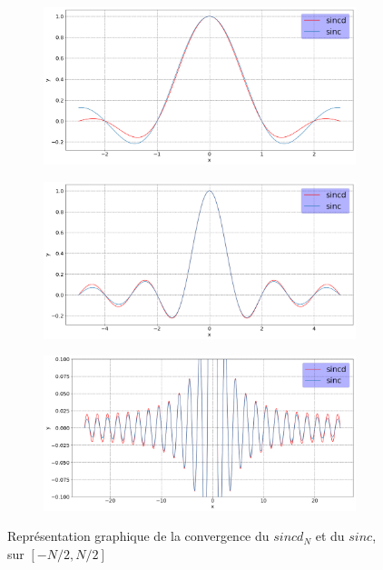 \documentclass[12pt,a4paper,onecolumn]{article}
\begin{document}
\begin{figure}[H]
	\centering
	\begin{subfigure}[b]{\textwidth}
		\centering
		\includegraphics[height = 0.25\textheight]{6_5}
		\label{fig_6_5}
	\end{subfigure}
	\begin{subfigure}[b]{\textwidth}
		\centering
		\includegraphics[height = 0.25\textheight]{6_10}
		\label{fig_6_10}
	\end{subfigure}
	\begin{subfigure}[b]{\textwidth}
		\centering
		\includegraphics[height = 0.25\textheight]{6_50}
		\label{fig_6_50}
	\end{subfigure}
	\caption{Représentation graphique de la convergence du \(sincd_N\) et du \(sinc\), sur \([-N/2, N/2]\)}
	\label{fig_6}
\end{figure}
\end{document}
